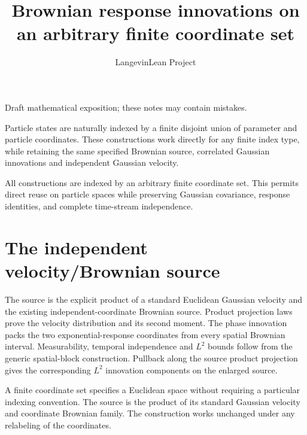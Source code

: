 \documentclass[11pt,a4paper]{article}
\title{\texorpdfstring{Brownian response innovations on an arbitrary finite coordinate set}{Brownian response innovations on an arbitrary finite coordinate set}}
\author{LangevinLean Project}
\date{}
\begin{document}
\maketitle
Draft mathematical exposition; these notes may contain mistakes.


Particle states are naturally indexed by a finite disjoint union of parameter and particle coordinates. These constructions work directly for any finite index type, while retaining the same specified Brownian source, correlated Gaussian innovations and independent Gaussian velocity.



All constructions are indexed by an arbitrary finite coordinate set. This permits direct reuse on particle spaces while preserving Gaussian covariance, response identities, and complete time-stream independence.


\section{\texorpdfstring{The independent velocity/\allowbreak{}Brownian source}{The independent velocity/Brownian source}}


The source is the explicit product of a standard Euclidean Gaussian velocity and the existing independent-coordinate Brownian source. Product projection laws prove the velocity distribution and its second moment. The phase innovation packs the two exponential-response coordinates from every spatial Brownian interval. Measurability, temporal independence and \(L^{2}\) bounds follow from the generic spatial-block construction. Pullback along the source product projection gives the corresponding \(L^{2}\) innovation components on the enlarged source.



A finite coordinate set specifies a Euclidean space without requiring a particular indexing convention. The source is the product of its standard Gaussian velocity and coordinate Brownian family. The construction works unchanged under any relabeling of the coordinates.
\end{document}
